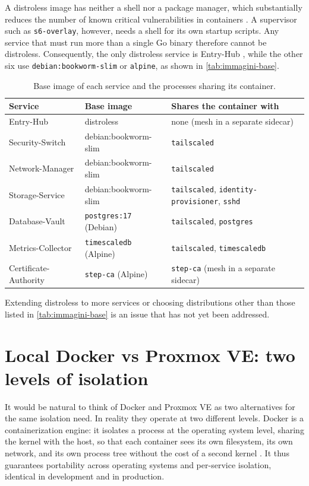 A distroless image \cite{distroless-github} has neither a shell nor a package manager, which substantially reduces
the number of known critical vulnerabilities in containers \cite{wager2024distroless}.
A supervisor such as \texttt{s6-overlay}, however, needs a shell for its own startup scripts.
Any service that must run more than a single Go binary therefore cannot be distroless.
Consequently, the only distroless service is Entry-Hub \cite{ramusb-code-dockerfile-entry-hub}, while
the other six use \texttt{debian:bookworm-slim} or \texttt{alpine}, as shown in
\autoref{tab:immagini-base}.

\begin{table}[H]
\centering
\caption{Base image of each service and the processes sharing its container.}
\label{tab:immagini-base}
\begin{tabular}{@{}l p{} p{}@{}}
\hline
\textbf{Service} & \textbf{Base image} & \textbf{Shares the container with} \\
\hline
Entry-Hub & distroless & none (mesh in a separate sidecar) \\
Security-Switch & debian:bookworm-slim & \texttt{tailscaled} \\
Network-Manager & debian:bookworm-slim & \texttt{tailscaled} \\
Storage-Service & debian:bookworm-slim & \texttt{tailscaled}, \texttt{identity-provisioner}, \texttt{sshd} \\
Database-Vault & \texttt{postgres:17} (Debian) & \texttt{tailscaled}, \texttt{postgres} \\
Metrics-Collector & \texttt{timescaledb} (Alpine) & \texttt{tailscaled}, \texttt{timescaledb} \\
Certificate-Authority & \texttt{step-ca} (Alpine) & \texttt{step-ca} (mesh in a separate sidecar) \\
\hline
\end{tabular}
\end{table}

Extending distroless to more services or choosing distributions other than those listed in
\autoref{tab:immagini-base} is an issue that has not yet been addressed.

\section{Local Docker vs Proxmox VE: two levels of isolation}
\label{sec:docker-vs-proxmox}

It would be natural to think of Docker and Proxmox VE \cite{proxmox-ve} as two alternatives for the same
isolation need. In reality they operate at two different levels. Docker is a containerization engine:
it isolates a process at the operating system level, sharing the kernel with the host, so that each container
sees its own filesystem, its own network, and its own process tree without the cost of a second
kernel \cite{docker-overview}. It thus guarantees portability across operating systems and per-service
isolation, identical in development and in production.

